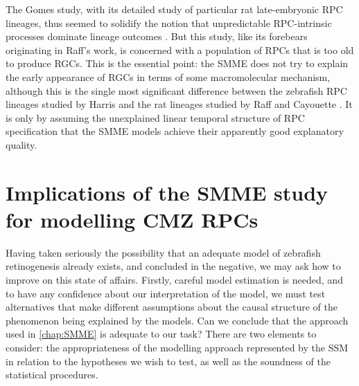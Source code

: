 The Gomes study, with its detailed study of particular rat late-embryonic RPC lineages, thus seemed to solidify the notion that unpredictable RPC-intrinsic processes dominate lineage outcomes \cite{Gomes2011}. But this study, like its forebears originating in Raff's work, is concerned with a population of RPCs that is too old to produce RGCs. This is the essential point: the SMME does not try to explain the early appearance of RGCs in terms of some macromolecular mechanism, although this is the single most significant difference between the zebrafish RPC lineages studied by Harris and the rat lineages studied by Raff and Cayouette \cite{Cayouette2003, Gomes2011}. It is only by assuming the unexplained linear temporal structure of RPC specification that the SMME models achieve their apparently good explanatory quality.

\section{Implications of the SMME study for modelling CMZ RPCs}
Having taken seriously the possibility that an adequate model of zebrafish retinogenesis already exists, and concluded in the negative, we may ask how to improve on this state of affairs. Firstly, careful model estimation is needed, and to have any confidence about our interpretation of the model, we must test alternatives that make different assumptions about the causal structure of the phenomenon being explained by the models. Can we conclude that the approach used in \autoref{chap:SMME} is adequate to our task? There are two elements to consider: the appropriateness of the modelling approach represented by the SSM in relation to the hypotheses we wish to test, as well as the soundness of the statistical procedures.

